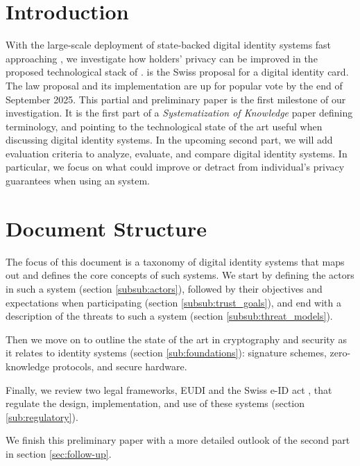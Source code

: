 \section{Introduction}

With the large-scale deployment of state-backed digital identity systems fast approaching \cite{Swiyu} \cite{EUDI-ARF}, we investigate how holders' privacy can be improved in the proposed technological stack of \swiyu.
\swiyu is the Swiss proposal for a digital identity card.
The law proposal and its implementation are up for popular vote by the end of September 2025.
This partial and preliminary paper is the first milestone of our investigation. 
It is the first part of a \emph{Systematization of Knowledge} paper defining terminology, and pointing to the technological state of the art useful when discussing digital identity systems.
In the upcoming second part, we will add evaluation criteria to analyze, evaluate, and compare digital identity systems.
In particular, we focus on what could improve or detract from individual's privacy guarantees when using an \eid system.

\section{Document Structure}

The focus of this document is a taxonomy of digital identity systems that maps out and defines the core concepts of such systems.
We start by defining the actors in such a system (section \ref{subsub:actors}), followed by their objectives and expectations when participating (section \ref{subsub:trust_goals}), and end with a description of the threats to such a system (section \ref{subsub:threat_models}).

Then we move on to outline the state of the art in cryptography and security as it relates to identity systems (section \ref{sub:foundations}): signature schemes, zero-knowledge protocols, and secure hardware.

Finally, we review two legal frameworks, EUDI \cite{EUDI} and the Swiss e-ID act \cite{SwiyuAct25}, that regulate the design, implementation, and use of these systems (section \ref{sub:regulatory}).

We finish this preliminary paper with a more detailed outlook of the second part in section \ref{sec:follow-up}.